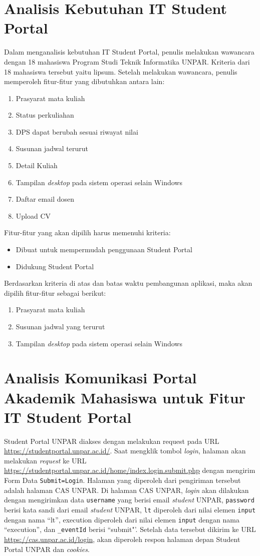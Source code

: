 \section{Analisis Kebutuhan IT Student Portal}
Dalam menganalisis kebutuhan IT Student Portal, penulis melakukan wawancara dengan 18 mahasiswa Program Studi Teknik Informatika UNPAR. Kriteria dari 18 mahasiswa tersebut yaitu lipsum. Setelah melakukan wawancara, penulis memperoleh fitur-fitur yang dibutuhkan antara lain:
\begin{enumerate}
	\item Prasyarat mata kuliah
	\item Status perkuliahan
	\item DPS dapat berubah sesuai riwayat nilai
	\item Susunan jadwal terurut
	\item Detail Kuliah
	\item Tampilan \textit{desktop} pada sistem operasi selain Windows 
	\item Daftar email dosen
	\item Upload CV
\end{enumerate}
Fitur-fitur yang akan dipilih harus memenuhi kriteria:
\begin{itemize}
	\item Dibuat untuk mempermudah penggunaan Student Portal
	\item Didukung Student Portal
\end{itemize}
Berdasarkan kriteria di atas dan batas waktu pembangunan aplikasi, maka akan dipilih fitur-fitur sebagai berikut:
\begin{enumerate}
	\item Prasyarat mata kuliah
	\item Susunan jadwal yang terurut 
	\item Tampilan \textit{desktop} pada sistem operasi selain Windows
\end{enumerate}


\section{Analisis Komunikasi Portal Akademik Mahasiswa untuk Fitur IT Student Portal}
Student Portal UNPAR diakses dengan melakukan request pada URL \url{https://studentportal.unpar.ac.id/}. Saat mengklik tombol \textit{login}, halaman akan melakukan \textit{request} ke URL \url{https://studentportal.unpar.ac.id/home/index.login.submit.php} dengan mengirim Form Data \texttt{Submit=Login}. Halaman yang diperoleh dari pengiriman tersebut adalah halaman CAS UNPAR. Di halaman CAS UNPAR, \textit{login} akan dilakukan dengan mengirimkan data \texttt{username} yang berisi email \textit{student} UNPAR, \texttt{password} berisi kata sandi dari email \textit{student} UNPAR, \texttt{lt} diperoleh dari nilai elemen \texttt{input} dengan nama ``lt'', execution diperoleh dari nilai elemen \texttt{input} dengan nama ``execution'', dan \texttt{\_eventId} berisi ``submit"'. Setelah data tersebut dikirim ke URL \url{https://cas.unpar.ac.id/login}, akan diperoleh respon halaman depan Student Portal UNPAR dan \textit{cookies}.
